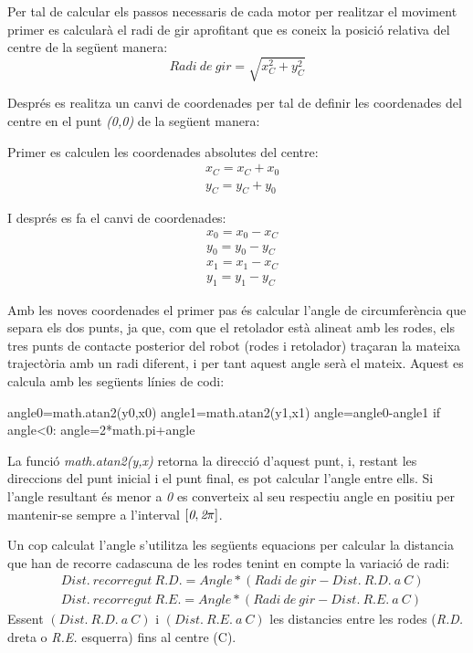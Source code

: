 Per tal de calcular els passos necessaris de cada motor per realitzar el moviment primer es calcularà el radi de gir aprofitant que es coneix la posició relativa del centre de la següent manera:
\begin{equation}
Radi \ de \ gir = \sqrt{x_{C}^2+y_{C}^2}
\end{equation}


Després es realitza un canvi de coordenades per tal de definir les coordenades del centre en el punt \emph{(0,0)} de la següent manera:

Primer es calculen les coordenades absolutes del centre:
\begin{eqnarray}
\nonumber & x_{C}=x_{C}+x_{0} \\
& y_{C}=y_{C}+y_{0}
\end{eqnarray}

I després es fa el canvi de coordenades:
\begin{eqnarray}
\nonumber & x_{0}=x_{0}-x_{C} \\
\nonumber & y_{0}=y_{0}-y_{C} \\
\nonumber & x_{1}=x_{1}-x_{C} \\
& y_{1}=y_{1}-y_{C}
\end{eqnarray}

Amb les noves coordenades el primer pas és calcular l’angle de circumferència que separa els dos punts, ja que, com que el retolador està alineat amb les rodes, els tres punts de contacte posterior del robot (rodes i retolador) traçaran la mateixa trajectòria amb un radi diferent, i per tant aquest angle serà el mateix. Aquest es calcula amb les següents línies de codi:

\begin{python}
angle0=math.atan2(y0,x0)
angle1=math.atan2(y1,x1)
angle=angle0-angle1
if angle<0:
angle=2*math.pi+angle
\end{python}

La funció \emph{math.atan2(y,x)} retorna la direcció d’aquest punt, i, restant les direccions del punt inicial i el punt final, es pot calcular l'angle entre ells. Si l’angle resultant és menor a \emph{0} es converteix al seu respectiu angle en positiu per mantenir-se sempre a l’interval $[\emph{0},\emph{2} \pi]$.

Un cop calculat l’angle s’utilitza les següents equacions per calcular la distancia que han de recorre cadascuna de les rodes tenint en compte la variació de radi:
\begin{eqnarray}
\nonumber &Dist. \ recorregut \ R.D. = Angle * (Radi \ de \ gir-Dist. \ R.D. \ a \ C) \\ 
&Dist. \ recorregut \ R.E. = Angle * (Radi \ de \ gir-Dist. \ R.E. \ a \ C)
\end{eqnarray}
Essent  $(Dist. \ R.D. \ a \ C)$ i $(Dist. \ R.E. \ a \ C)$ les distancies entre les rodes (\emph{R.D.} dreta o \emph{R.E.} esquerra) fins al centre (C).

